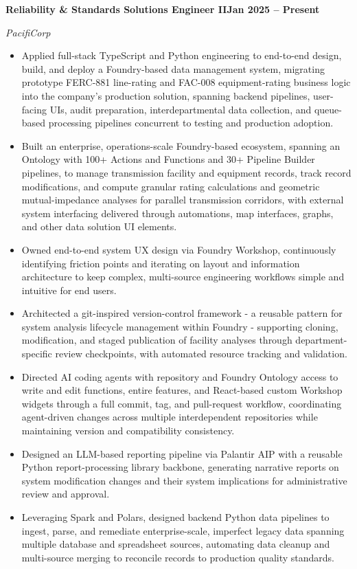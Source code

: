 \documentclass[10pt, letterpaper]{article}
\newcommand{\jobline}[2]{%
  \vspace{5pt}%
  \noindent\textbf{#1}\hfill\textbf{#2}\par%
  \vspace{1pt}%
}
\newcommand{\subline}[1]{%
  \vspace{-1pt}%
  \noindent\textit{#1}\par%
  \vspace{1pt}%
}
\newenvironment{rlist}{%
  \begin{itemize}[leftmargin=1.4em, itemsep=1pt, topsep=2pt, parsep=0pt]%
}{%
  \end{itemize}%
}
\begin{document}
\jobline{Reliability \& Standards Solutions Engineer II}{Jan 2025 -- Present}
\subline{PacifiCorp}
\begin{rlist}
  \item Applied full-stack TypeScript and Python engineering to end-to-end design, build, and deploy a Foundry-based data management system, migrating prototype FERC-881 line-rating and FAC-008 equipment-rating business logic into the company's production solution, spanning backend pipelines, user-facing UIs, audit preparation, interdepartmental data collection, and queue-based processing pipelines concurrent to testing and production adoption.
  \item Built an enterprise, operations-scale Foundry-based ecosystem, spanning an Ontology with 100+ Actions and Functions and 30+ Pipeline Builder pipelines, to manage transmission facility and equipment records, track record modifications, and compute granular rating calculations and geometric mutual-impedance analyses for parallel transmission corridors, with external system interfacing delivered through automations, map interfaces, graphs, and other data solution UI elements.
  \item Owned end-to-end system UX design via Foundry Workshop, continuously identifying friction points and iterating on layout and information architecture to keep complex, multi-source engineering workflows simple and intuitive for end users.
  \item Architected a git-inspired version-control framework - a reusable pattern for system analysis lifecycle management within Foundry - supporting cloning, modification, and staged publication of facility analyses through department-specific review checkpoints, with automated resource tracking and validation.
  \item Directed AI coding agents with repository and Foundry Ontology access to write and edit functions, entire features, and React-based custom Workshop widgets through a full commit, tag, and pull-request workflow, coordinating agent-driven changes across multiple interdependent repositories while maintaining version and compatibility consistency.
  \item Designed an LLM-based reporting pipeline via Palantir AIP with a reusable Python report-processing library backbone, generating narrative reports on system modification changes and their system implications for administrative review and approval.
  \item Leveraging Spark and Polars, designed backend Python data pipelines to ingest, parse, and remediate enterprise-scale, imperfect legacy data spanning multiple database and spreadsheet sources, automating data cleanup and multi-source merging to reconcile records to production quality standards.

\end{rlist}
\end{document}
